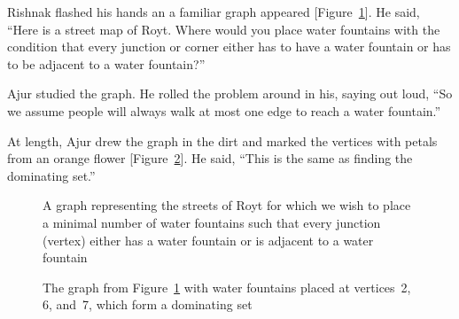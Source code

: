 Rishnak flashed his hands an a familiar graph appeared [Figure~\ref{18g2}]. He said, ``Here is a street map of Royt. Where would you place water fountains with the condition that every junction or corner either has to have a water fountain or has to be adjacent to a water fountain?''

Ajur studied the graph. He rolled the problem around in his, saying out loud, ``So we assume people will always walk at most one edge to reach a water fountain.''

At length, Ajur drew the graph in the dirt and marked the vertices with petals from an orange flower [Figure~\ref{18g3}]. He said, ``This is the same as finding the dominating set.''

\begin{figure}
\begin{center}

\caption{A graph representing the streets of Royt for which we wish to place a minimal number of water fountains such that every junction (vertex) either has a water fountain or is adjacent to a water fountain}\label{18g2}
\end{center}
\end{figure}

\begin{figure}
\begin{center}

\caption{The graph from Figure~\ref{18g2} with water fountains placed at vertices~2, 6, and~7, which form a dominating set}\label{18g3}
\end{center}
\end{figure}

